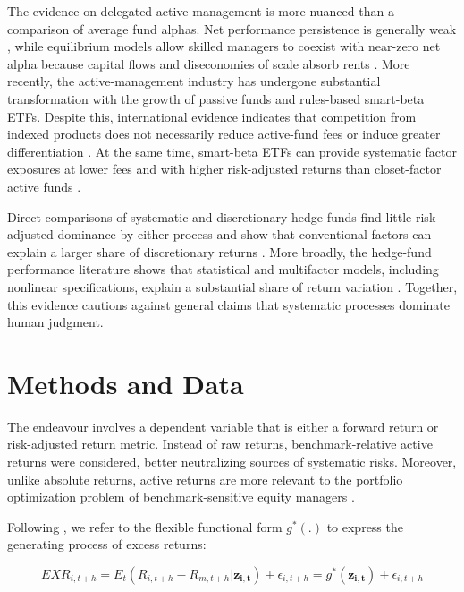 \documentclass[preprint,12pt,authoryear]{elsarticle}
\begin{document}
The evidence on delegated active management is more nuanced than a comparison of average fund alphas. Net performance persistence is generally weak \citep{carhart1997, famafrench2010}, while equilibrium models allow skilled managers to coexist with near-zero net alpha because capital flows and diseconomies of scale absorb rents \citep{berkgreen2004, pastorstambaughtaylor2015}. More recently, the active-management industry has undergone substantial transformation with the growth of passive funds and rules-based smart-beta ETFs. Despite this, international evidence indicates that competition from indexed products does not necessarily reduce active-fund fees or induce greater differentiation \citep{carneiroeidyoshinaga2022}. At the same time, smart-beta ETFs can provide systematic factor exposures at lower fees and with higher risk-adjusted returns than closet-factor active funds \citep{le2023}. 

Direct comparisons of systematic and discretionary hedge funds find little risk-adjusted dominance by either process and show that conventional factors can explain a larger share of discretionary returns \citep{harveyrattraysinclairvanhemert2017}. More broadly, the hedge-fund performance literature shows that statistical and multifactor models, including nonlinear specifications, explain a substantial share of return variation \citep{stafylasandersonuddin2017}. Together, this evidence cautions against general claims that systematic processes dominate human judgment.


\section{Methods and Data}
\label{sec:methods}
The endeavour involves a dependent variable that is either a forward return or risk-adjusted return metric. Instead of raw returns, benchmark-relative active returns were considered, better neutralizing sources of systematic risks. Moreover, unlike absolute returns, active returns are more relevant to the portfolio optimization problem of benchmark-sensitive equity managers \citep{hsuetal2022}.

Following \citet{gukellyxiu2020}, we refer to the flexible functional form $g^{*}(.)$ to express the generating process of excess returns:

\begin{equation}
\label{maineq}
EXR_{i,t+h} = E_{t}(R_{i,t+h} - R_{m,t+h}|\mathbf{z_{i,t}}) + \epsilon_{i,t+h} = g^{*}(\mathbf{z_{i,t}}) + \epsilon_{i,t+h}
\end{equation}
\end{document}
